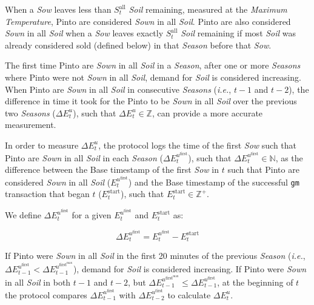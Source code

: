 \documentclass[tikz]{article}
\makeatletter
\newenvironment{keepunit}{%
  \par\penalty0\begingroup
  \edef\keepunitparskip{\the\parskip}%
  \noindent\begin{minipage}[t]{\linewidth}%
  \setlength{\parskip}{\keepunitparskip}%
  \@minipagefalse
}{%
  \end{minipage}\par\endgroup
}
\newcommand{\code}[1]{\texttt{#1}}
\newcommand{\term}[1]{\textsl{#1}}
\makeatother
\begin{document}
When a \term{Sow} leaves less than $S_t^{\text{all}}$ \term{Soil} remaining, measured at the \term{Maximum Temperature}, Pinto are considered \term{Sown} in all \term{Soil}. Pinto are also considered \term{Sown} in all \term{Soil} when a \term{Sow} leaves exactly $S_t^{\text{all}}$ \term{Soil} remaining if most \term{Soil} was already considered sold (defined below) in that \term{Season} before that \term{Sow}.

The first time Pinto are \term{Sown} in all \term{Soil} in a \term{Season}, after one or more \term{Seasons} where Pinto were not \term{Sown} in all \term{Soil}, demand for \term{Soil} is considered increasing. When Pinto are \term{Sown} in all \term{Soil} in consecutive \term{Seasons} (\textit{i.e.}, $t-1$ and $t-2$), the difference in time it took for the Pinto to be \term{Sown} in all \term{Soil} over the previous two \term{Seasons} ($\Delta E_{t}^{u}$), such that $\Delta E_{t}^{u} \in \mathbb{Z}$, can provide a more accurate measurement.

In order to measure $\Delta E_{t}^{u}$, the protocol logs the time of the first \term{Sow} such that Pinto are \term{Sown} in all \term{Soil} in each \term{Season} ($\Delta E_{t}^{u^{\text{first}}}$), such that $\Delta E_{t}^{u^{\text{first}}} \in \mathbb{N}$, as the difference between the Base timestamp of the first \term{Sow} in $t$ such that Pinto are considered \term{Sown} in all \term{Soil} ($E_{t}^{u^{\text{first}}}$) and the Base timestamp of the successful \code{gm} transaction that began $t$ ($E_{t}^{\text{start}}$), such that $E_{t}^{\text{start}} \in \mathbb{Z}^{+}$.

\begin{keepunit}
We define $\Delta E_{t}^{u^{\text{first}}}$ for a given $E_{t}^{u^{\text{first}}}$ and $E_{t}^{\text{start}}$ as:

    $$
        \Delta E_{t}^{u^{\text{first}}} =
            E_{t}^{u^{\text{first}}} - E_{t}^{\text{start}}
    $$
\end{keepunit}

If Pinto were \term{Sown} in all \term{Soil} in the first 20 minutes of the previous \term{Season} (\textit{i.e.}, $\Delta E_{t-1}^{u^{\text{first}}} < \Delta E_{t-1}^{u^{\text{first}^{\text{max}}}}$), demand for \term{Soil} is considered increasing. If Pinto were \term{Sown} in all \term{Soil} in both $t-1$ and $t-2$, but $\Delta E_{t-1}^{u^{\text{first}^{\text{max}}}} \leq \Delta E_{t-1}^{u^{\text{first}}}$, at the beginning of $t$ the protocol compares $\Delta E_{t-1}^{u^{\text{first}}}$ with $\Delta E_{t-2}^{u^{\text{first}}}$ to calculate $\Delta E_{t}^{u}$.
\end{document}
